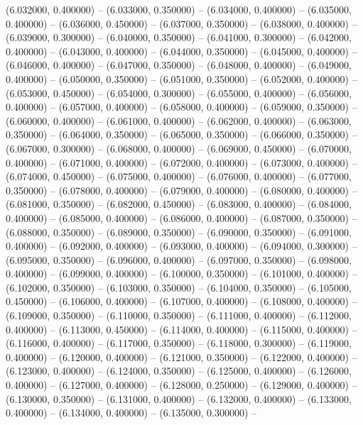 (6.032000, 0.400000) -- 
(6.033000, 0.350000) -- 
(6.034000, 0.400000) -- 
(6.035000, 0.400000) -- 
(6.036000, 0.450000) -- 
(6.037000, 0.350000) -- 
(6.038000, 0.400000) -- 
(6.039000, 0.300000) -- 
(6.040000, 0.350000) -- 
(6.041000, 0.300000) -- 
(6.042000, 0.400000) -- 
(6.043000, 0.400000) -- 
(6.044000, 0.350000) -- 
(6.045000, 0.400000) -- 
(6.046000, 0.400000) -- 
(6.047000, 0.350000) -- 
(6.048000, 0.400000) -- 
(6.049000, 0.400000) -- 
(6.050000, 0.350000) -- 
(6.051000, 0.350000) -- 
(6.052000, 0.400000) -- 
(6.053000, 0.450000) -- 
(6.054000, 0.300000) -- 
(6.055000, 0.400000) -- 
(6.056000, 0.400000) -- 
(6.057000, 0.400000) -- 
(6.058000, 0.400000) -- 
(6.059000, 0.350000) -- 
(6.060000, 0.400000) -- 
(6.061000, 0.400000) -- 
(6.062000, 0.400000) -- 
(6.063000, 0.350000) -- 
(6.064000, 0.350000) -- 
(6.065000, 0.350000) -- 
(6.066000, 0.350000) -- 
(6.067000, 0.300000) -- 
(6.068000, 0.400000) -- 
(6.069000, 0.450000) -- 
(6.070000, 0.400000) -- 
(6.071000, 0.400000) -- 
(6.072000, 0.400000) -- 
(6.073000, 0.400000) -- 
(6.074000, 0.450000) -- 
(6.075000, 0.400000) -- 
(6.076000, 0.400000) -- 
(6.077000, 0.350000) -- 
(6.078000, 0.400000) -- 
(6.079000, 0.400000) -- 
(6.080000, 0.400000) -- 
(6.081000, 0.350000) -- 
(6.082000, 0.450000) -- 
(6.083000, 0.400000) -- 
(6.084000, 0.400000) -- 
(6.085000, 0.400000) -- 
(6.086000, 0.400000) -- 
(6.087000, 0.350000) -- 
(6.088000, 0.350000) -- 
(6.089000, 0.350000) -- 
(6.090000, 0.350000) -- 
(6.091000, 0.400000) -- 
(6.092000, 0.400000) -- 
(6.093000, 0.400000) -- 
(6.094000, 0.300000) -- 
(6.095000, 0.350000) -- 
(6.096000, 0.400000) -- 
(6.097000, 0.350000) -- 
(6.098000, 0.400000) -- 
(6.099000, 0.400000) -- 
(6.100000, 0.350000) -- 
(6.101000, 0.400000) -- 
(6.102000, 0.350000) -- 
(6.103000, 0.350000) -- 
(6.104000, 0.350000) -- 
(6.105000, 0.450000) -- 
(6.106000, 0.400000) -- 
(6.107000, 0.400000) -- 
(6.108000, 0.400000) -- 
(6.109000, 0.350000) -- 
(6.110000, 0.350000) -- 
(6.111000, 0.400000) -- 
(6.112000, 0.400000) -- 
(6.113000, 0.450000) -- 
(6.114000, 0.400000) -- 
(6.115000, 0.400000) -- 
(6.116000, 0.400000) -- 
(6.117000, 0.350000) -- 
(6.118000, 0.300000) -- 
(6.119000, 0.400000) -- 
(6.120000, 0.400000) -- 
(6.121000, 0.350000) -- 
(6.122000, 0.400000) -- 
(6.123000, 0.400000) -- 
(6.124000, 0.350000) -- 
(6.125000, 0.400000) -- 
(6.126000, 0.400000) -- 
(6.127000, 0.400000) -- 
(6.128000, 0.250000) -- 
(6.129000, 0.400000) -- 
(6.130000, 0.350000) -- 
(6.131000, 0.400000) -- 
(6.132000, 0.400000) -- 
(6.133000, 0.400000) -- 
(6.134000, 0.400000) -- 
(6.135000, 0.300000) -- 
